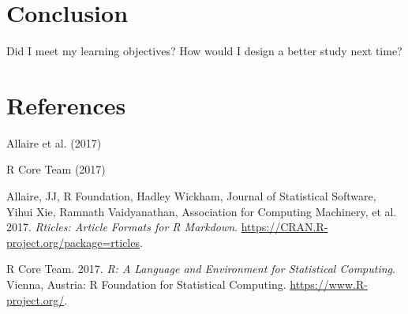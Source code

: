 \documentclass[]{elsarticle} %
\begin{document}
\section{Conclusion}\label{conclusion}

Did I meet my learning objectives? How would I design a better study
next time?

\section{References}\label{references.unnumbered}

Allaire et al. (2017)

R Core Team (2017)

\hypertarget{refs}{}
\hypertarget{ref-Allaire2017}{}
Allaire, JJ, R Foundation, Hadley Wickham, Journal of Statistical
Software, Yihui Xie, Ramnath Vaidyanathan, Association for Computing
Machinery, et al. 2017. \emph{Rticles: Article Formats for R Markdown}.
\url{https://CRAN.R-project.org/package=rticles}.

\hypertarget{ref-CRAN}{}
R Core Team. 2017. \emph{R: A Language and Environment for Statistical
Computing}. Vienna, Austria: R Foundation for Statistical Computing.
\url{https://www.R-project.org/}.
\end{document}
